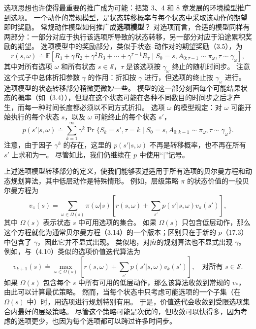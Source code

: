 \documentclass[UTF8,12pt,a4paper,fontset=fandol]{ctexart}
\begin{document}
选项思想也许使得最重要的推广成为可能：把第 3、4 和 8 章发展的环境模型推广到选项。
一个动作的常规模型，是状态转移概率与每个状态中采取该动作的期望即时奖励。
常规动作模型如何推广成\textbf{选项模型}？
对选项而言，合适的模型同样有两部分：一部分对应于执行该选项所导致的状态转移，另一部分对应于沿途累积奖励的期望。
选项模型中的奖励部分，类似于状态--动作对的期望奖励（3.5），为
\begin{equation}
r(s,\omega)\doteq
\mathbb{E}\left[
R_1+\gamma R_2+\gamma^2R_3+\cdots+\gamma^{\tau-1}R_\tau
\mid S_0=s,A_{0:\tau-1}\sim\pi_\omega,\tau\sim\gamma_\omega
\right],
\tag{17.2}
\end{equation}
其中对所有选项 $\omega$ 和所有状态 $s\in\mathcal{S}$，$\tau$ 是该选项按 $\gamma_\omega$ 终止的随机时间步。
注意这个式子中总体折扣参数 $\gamma$ 的作用：折扣按 $\gamma$ 进行，但选项的终止按 $\gamma_\omega$ 进行。
选项模型的状态转移部分稍微更微妙一些。
模型的这一部分刻画每个可能结果状态的概率（如（3.4）），但现在这个状态可能在各种不同数目的时间步之后才产生，而每一种时间长度都必须以不同方式折扣。
选项 $\omega$ 的模型规定：对 $\omega$ 可能开始执行的每个状态 $s$，以及 $\omega$ 可能终止的每个状态 $s'$，
\begin{equation}
p(s'|s,\omega)\doteq
\sum_{k=1}^{\infty}\gamma^k
\Pr\{S_k=s',\tau=k\mid S_0=s,A_{0:k-1}\sim\pi_\omega,\tau\sim\gamma_\omega\}.
\tag{17.3}
\end{equation}
注意，由于因子 $\gamma^k$ 的存在，这里的 $p(s'|s,\omega)$ 不再是转移概率，也不再在所有 $s'$ 上求和为一。
尽管如此，我们仍继续在 $p$ 中使用“$|$”记号。

上述选项模型转移部分的定义，使我们能够表述适用于所有选项的贝尔曼方程和动态规划算法，其中低层动作是特殊情形。
例如，层级策略 $\pi$ 的状态价值的一般贝尔曼方程为
\begin{equation}
v_\pi(s)=
\sum_{\omega\in\Omega(s)}\pi(\omega|s)
\left[
r(s,\omega)+\sum_{s'}p(s'|s,\omega)v_\pi(s')
\right],
\tag{17.4}
\end{equation}
其中 $\Omega(s)$ 表示状态 $s$ 中可用选项的集合。
如果 $\Omega(s)$ 只包含低层动作，那么这个方程就化为通常贝尔曼方程（3.14）的一个版本；区别只在于新的 $p$（17.3）中包含了 $\gamma$，因此它并不显式出现。
类似地，对应的规划算法也不显式出现 $\gamma$。
例如，与（4.10）类似的选项价值迭代算法为
\[
v_{k+1}(s)\doteq
\max_{\omega\in\Omega(s)}
\left[
r(s,\omega)+\sum_{s'}p(s'|s,\omega)v_k(s')
\right],
\quad \text{对所有 }s\in\mathcal{S}.
\]
如果 $\Omega(s)$ 包含每个 $s$ 中所有可用的低层动作，那么该算法收敛到常规的 $v_*$，由此可以计算最优策略。
然而，当每个状态中只考虑可能选项的一个子集（在 $\Omega(s)$ 中）时，用选项进行规划特别有用。
于是，价值迭代会收敛到受限选项集合内最好的层级策略。
尽管这个策略可能是次优的，但收敛可以快得多，因为考虑的选项更少，也因为每个选项都可以跨过许多时间步。
\end{document}
